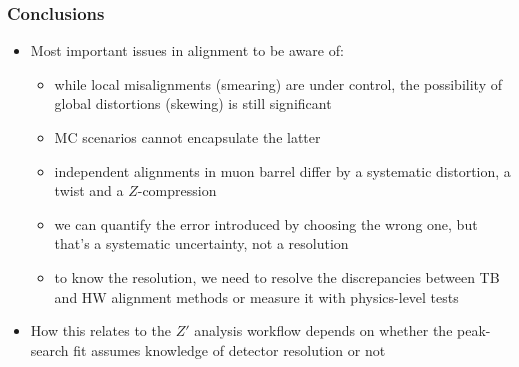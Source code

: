 \documentclass[compress]{beamer}
\begin{document}
\begin{frame}
\frametitle{Conclusions}
\begin{itemize}
\item Most important issues in alignment to be aware of:
\begin{itemize}\setlength{\itemsep}{0.2 cm}
\item while local misalignments (smearing) are under control, the
  possibility of global distortions (skewing) is still significant

\item MC scenarios cannot encapsulate the latter

\item independent alignments in muon barrel differ by a systematic
  distortion, a twist and a $Z$-compression

\item we can quantify the error introduced by choosing the wrong one,
  but that's a systematic uncertainty, not a resolution

\item to know the resolution, we need to resolve the discrepancies
  between TB and HW alignment methods or measure it with physics-level
  tests
\end{itemize}

\item How this relates to the $Z'$ analysis workflow depends on
  whether the peak-search fit assumes knowledge of detector resolution
  or not
\end{itemize}
\label{numpages}
\end{frame}
\end{document}
